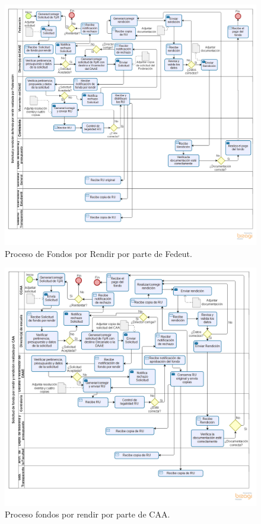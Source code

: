 \begin{figure}[htbp!]
    \hspace{-9mm}
    \includegraphics[width=1.1\textwidth]{Imagenes/Solicitud_Federacion.png}
    \caption{\label{fig: Solicitud_Federacion}Proceso de Fondos por Rendir por parte de Fedeut.}
\end{figure}


\begin{figure}[htbp!]
    \hspace{-9mm}
    \includegraphics[width=1.1\textwidth]{Imagenes/Solicitud_CCAA.png}
    \caption{\label{fig: Solicitud_CAA}Proceso fondos por rendir por parte de CAA.}
\end{figure}